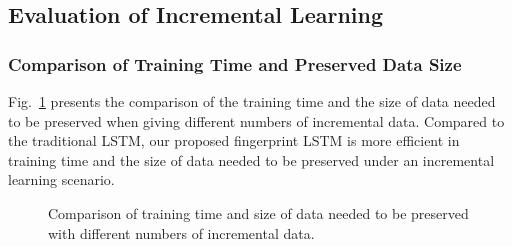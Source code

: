 \subsection{Evaluation of Incremental Learning}

\subsubsection{Comparison of Training Time and Preserved Data Size}
\label{sec:inc_time_size}
Fig.~\ref{fig:inc_time_size} presents the comparison of the training time and the size of data needed to be preserved when giving different numbers of incremental data.
Compared to the traditional LSTM, our proposed fingerprint LSTM is more efficient in training time and the size of data needed to be preserved under an incremental learning scenario. 

\begin{figure}[htbp]
	\centering
	\hfill
	\caption{Comparison of training time and size of data needed to be preserved with different numbers of incremental data.}
	\label{fig:inc_time_size}
\end{figure}

